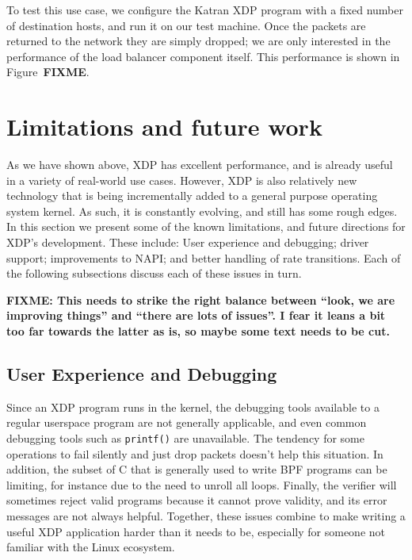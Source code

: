\documentclass[10pt,sigconf]{acmart}
\begin{document}
To test this use case, we configure the Katran XDP program with a fixed number
of destination hosts, and run it on our test machine. Once the packets are
returned to the network they are simply dropped; we are only interested in the
performance of the load balancer component itself. This performance is shown in
Figure~\textbf{FIXME}.

\section{Limitations and future work}
\label{sec:limitations}
As we have shown above, XDP has excellent performance, and is already useful in
a variety of real-world use cases. However, XDP is also relatively new
technology that is being incrementally added to a general purpose operating
system kernel. As such, it is constantly evolving, and still has some rough
edges. In this section we present some of the known limitations, and future
directions for XDP's development. These include: User experience and debugging;
driver support; improvements to NAPI; and better handling of rate transitions.
Each of the following subsections discuss each of these issues in turn.

\textbf{FIXME: This needs to strike the right balance between ``look, we are
  improving things'' and ``there are lots of issues''. I fear it leans a bit too
far towards the latter as is, so maybe some text needs to be cut.}

\subsection{User Experience and Debugging}
\label{sec:user-exper-debugg}
Since an XDP program runs in the kernel, the debugging tools available to a
regular userspace program are not generally applicable, and even common
debugging tools such as \texttt{printf()} are unavailable. The tendency for some
operations to fail silently and just drop packets doesn't help this situation.
In addition, the subset of C that is generally used to write BPF programs can be
limiting, for instance due to the need to unroll all loops. Finally, the
verifier will sometimes reject valid programs because it cannot prove validity,
and its error messages are not always helpful. Together, these issues combine to
make writing a useful XDP application harder than it needs to be, especially for
someone not familiar with the Linux ecosystem.
\end{document}
